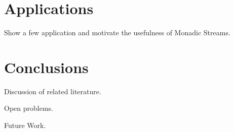 \documentclass{article}
\begin{document}
\section{Applications}

Show a few application and motivate the usefulness of Monadic Streams.

\section{Conclusions}

Discussion of related literature.

Open problems.

Future Work.


\end{document}
